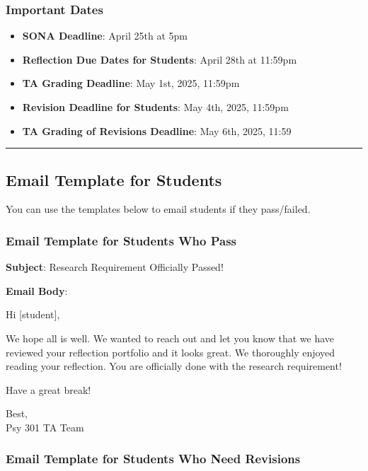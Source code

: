 \documentclass[
]{article}
\providecommand{\tightlist}{%
  \setlength{\itemsep}{0pt}\setlength{\parskip}{0pt}}
\begin{document}
\hypertarget{important-dates}{%
\subsubsection{Important Dates}\label{important-dates}}

\begin{itemize}
\tightlist
\item
  \textbf{SONA Deadline}: April 25th at 5pm
\item
  \textbf{Reflection Due Dates for Students}: April 28th at 11:59pm
\item
  \textbf{TA Grading Deadline}: May 1st, 2025, 11:59pm
\item
  \textbf{Revision Deadline for Students}: May 4th, 2025, 11:59pm
\item
  \textbf{TA Grading of Revisions Deadline}: May 6th, 2025, 11:59
\end{itemize}

\begin{center}\rule{0.5\linewidth}{0.5pt}\end{center}

\hypertarget{email-template-for-students}{%
\subsection{Email Template for Students}\label{email-template-for-students}}

You can use the templates below to email students if they pass/failed.

\hypertarget{email-template-for-students-who-pass}{%
\subsubsection{Email Template for Students Who Pass}\label{email-template-for-students-who-pass}}

\textbf{Subject}: Research Requirement Officially Passed!

\textbf{Email Body}:

Hi {[}student{]},

We hope all is well. We wanted to reach out and let you know that we have reviewed your reflection portfolio and it looks great. We thoroughly enjoyed reading your reflection. You are officially done with the research requirement!

Have a great break!

Best,\\
Psy 301 TA Team

\hypertarget{email-template-for-students-who-need-revisions}{%
\subsubsection{Email Template for Students Who Need Revisions}\label{email-template-for-students-who-need-revisions}}
\end{document}
